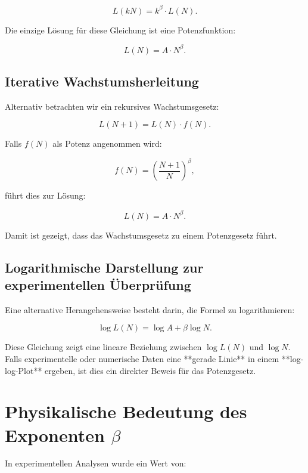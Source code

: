 \documentclass[a4paper,12pt]{article}
\begin{document}
\begin{equation}
    L(kN) = k^\beta \cdot L(N).
\end{equation}

Die einzige Lösung für diese Gleichung ist eine Potenzfunktion:

\begin{equation}
    L(N) = A \cdot N^\beta.
\end{equation}

\subsection{Iterative Wachstumsherleitung}
Alternativ betrachten wir ein rekursives Wachstumsgesetz:

\begin{equation}
    L(N+1) = L(N) \cdot f(N).
\end{equation}

Falls \( f(N) \) als Potenz angenommen wird:

\begin{equation}
    f(N) = \left( \frac{N+1}{N} \right)^\beta,
\end{equation}

führt dies zur Lösung:

\begin{equation}
    L(N) = A \cdot N^\beta.
\end{equation}

Damit ist gezeigt, dass das Wachstumsgesetz zu einem Potenzgesetz führt.

\subsection{Logarithmische Darstellung zur experimentellen Überprüfung}
Eine alternative Herangehensweise besteht darin, die Formel zu logarithmieren:

\begin{equation}
    \log L(N) = \log A + \beta \log N.
\end{equation}

Diese Gleichung zeigt eine lineare Beziehung zwischen \( \log L(N) \) und \( \log N \). Falls experimentelle oder numerische Daten eine **gerade Linie** in einem **log-log-Plot** ergeben, ist dies ein direkter Beweis für das Potenzgesetz.

\section{Physikalische Bedeutung des Exponenten \( \beta \)}
In experimentellen Analysen wurde ein Wert von:
\end{document}
